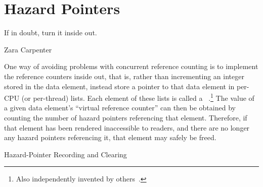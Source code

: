 
\section{Hazard Pointers}
\label{sec:defer:Hazard Pointers}
%
\epigraph{If in doubt, turn it inside out.}{Zara Carpenter}

One way of avoiding problems with concurrent reference counting
is to implement the reference counters
inside out, that is, rather than incrementing an integer stored in the
data element, instead store a pointer to that data element in
per-CPU (or per-thread) lists.
Each element of these lists is called a
\emph{}~\cite{MagedMichael04a}.\footnote{
	Also independently invented by others~\cite{HerlihyLM02}.}
The value of a given data element's ``virtual reference counter'' can
then be obtained by counting the number of hazard pointers referencing
that element.
Therefore, if that element has been rendered inaccessible to readers,
and there are no longer any hazard pointers referencing it, that element
may safely be freed.

\begin{listing}

\caption{Hazard-Pointer Recording and Clearing}
\label{lst:defer:Hazard-Pointer Recording and Clearing}
\end{listing}

